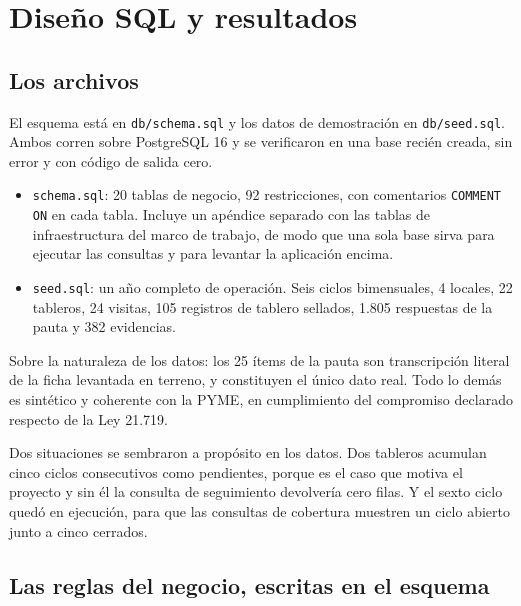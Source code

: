 \documentclass[10pt,letterpaper]{article}
\begin{document}
\newpage

\section{Diseño SQL y resultados}

\subsection{Los archivos}

El esquema está en \texttt{db/schema.sql} y los datos de demostración en
\texttt{db/seed.sql}. Ambos corren sobre PostgreSQL 16 y se verificaron en una
base recién creada, sin error y con código de salida cero.

\begin{itemize}
  \item \texttt{schema.sql}: 20 tablas de negocio, 92 restricciones, con
  comentarios \texttt{COMMENT ON} en cada tabla. Incluye un apéndice separado
  con las tablas de infraestructura del marco de trabajo, de modo que una sola
  base sirva para ejecutar las consultas y para levantar la aplicación encima.
  \item \texttt{seed.sql}: un año completo de operación. Seis ciclos
  bimensuales, 4 locales, 22 tableros, 24 visitas, 105 registros de tablero
  sellados, 1.805 respuestas de la pauta y 382 evidencias.
\end{itemize}

Sobre la naturaleza de los datos: los 25 ítems de la pauta son transcripción
literal de la ficha levantada en terreno, y constituyen el único dato real.
Todo lo demás es sintético y coherente con la PYME, en cumplimiento del
compromiso declarado respecto de la Ley 21.719.

Dos situaciones se sembraron a propósito en los datos. Dos tableros acumulan
cinco ciclos consecutivos como pendientes, porque es el caso que motiva el
proyecto y sin él la consulta de seguimiento devolvería cero filas. Y el sexto
ciclo quedó en ejecución, para que las consultas de cobertura muestren un ciclo
abierto junto a cinco cerrados.

\subsection{Las reglas del negocio, escritas en el esquema}
\end{document}
